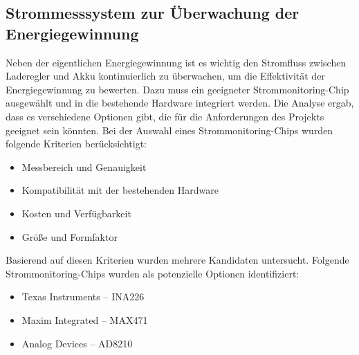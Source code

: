 \documentclass{article}
\begin{document}
\subsection{Strommesssystem zur Überwachung der Energiegewinnung}
Neben der eigentlichen Energiegewinnung ist es wichtig den Stromfluss zwischen Laderegler und Akku kontinuierlich zu überwachen, um die Effektivität 
der Energiegewinnung zu bewerten. Dazu muss ein geeigneter Strommonitoring-Chip ausgewählt und in die bestehende Hardware integriert werden.
Die Analyse ergab, dass es verschiedene Optionen gibt, die für die Anforderungen des Projekts geeignet sein könnten. Bei der Auswahl eines Strommonitoring-Chips 
wurden folgende Kriterien berücksichtigt:
\begin{itemize}
    \item Messbereich und Genauigkeit
    \item Kompatibilität mit der bestehenden Hardware
    \item Kosten und Verfügbarkeit
    \item Größe und Formfaktor
\end{itemize}
Basierend auf diesen Kriterien wurden mehrere Kandidaten untersucht. Folgende Strommonitoring-Chips wurden als potenzielle Optionen identifiziert:
\begin{itemize}
    \item Texas Instruments – INA226 \cite{INA226}
    \item Maxim Integrated – MAX471 \cite{MAX471}
    \item Analog Devices – AD8210 \cite{AD8210}
\end{itemize}
\end{document}
